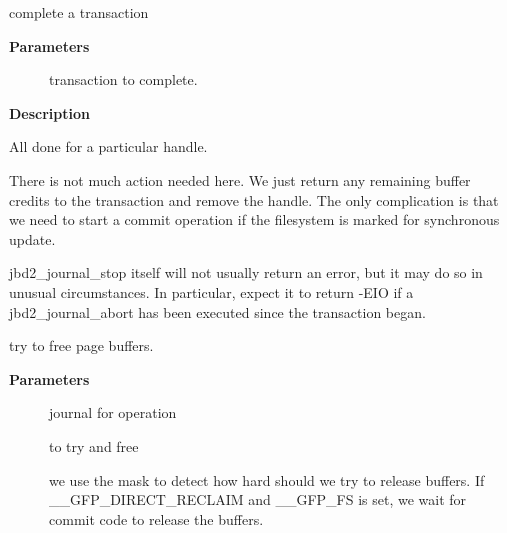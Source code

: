 \documentclass[a4paper,8pt,english]{sphinxmanual}
\begin{document}
\begin{fulllineitems}
\label{filesystems/index:c.jbd2_journal_stop}
complete a transaction

\end{fulllineitems}


\textbf{Parameters}
\begin{description}
\item[{}] \leavevmode
transaction to complete.

\end{description}

\textbf{Description}

All done for a particular handle.

There is not much action needed here.  We just return any remaining
buffer credits to the transaction and remove the handle.  The only
complication is that we need to start a commit operation if the
filesystem is marked for synchronous update.

jbd2\_journal\_stop itself will not usually return an error, but it may
do so in unusual circumstances.  In particular, expect it to
return -EIO if a jbd2\_journal\_abort has been executed since the
transaction began.

\begin{fulllineitems}
\label{filesystems/index:c.jbd2_journal_try_to_free_buffers}
try to free page buffers.

\end{fulllineitems}


\textbf{Parameters}
\begin{description}
\item[{}] \leavevmode
journal for operation

\item[{}] \leavevmode
to try and free

\item[{}] \leavevmode
we use the mask to detect how hard should we try to release
buffers. If \_\_GFP\_DIRECT\_RECLAIM and \_\_GFP\_FS is set, we wait for commit
code to release the buffers.

\end{description}
\end{document}
